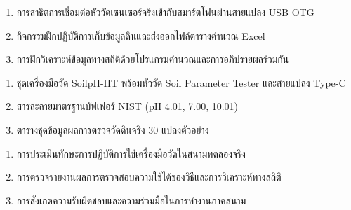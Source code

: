 \begin{tcolorbox}[
    enhanced, breakable,
    colback=white, colframe=rbruNavy,
    fonttitle=\bfseries\color{white},
    title={3. วิธีสอนและกิจกรรมการเรียนการสอน},
    arc=1.5mm, boxrule=0.8pt, leftrule=3.5mm
]
\begin{enumerate}
    \item การสาธิตการเชื่อมต่อหัววัดเซนเซอร์จริงเข้ากับสมาร์ตโฟนผ่านสายแปลง USB OTG
    \item กิจกรรมฝึกปฏิบัติการเก็บข้อมูลดินและส่งออกไฟล์ตารางคำนวณ Excel
    \item การฝึกวิเคราะห์ข้อมูลทางสถิติด้วยโปรแกรมคำนวณและการอภิปรายผลร่วมกัน
\end{enumerate}
\end{tcolorbox}

\begin{tcolorbox}[
    enhanced, breakable,
    colback=white, colframe=rbruNavy,
    fonttitle=\bfseries\color{white},
    title={4. สื่อการเรียนการสอน},
    arc=1.5mm, boxrule=0.8pt, leftrule=3.5mm
]
\begin{enumerate}
    \item ชุดเครื่องมือวัด SoilpH-HT พร้อมหัววัด Soil Parameter Tester และสายแปลง Type-C
    \item สารละลายมาตรฐานบัฟเฟอร์ NIST (pH 4.01, 7.00, 10.01)
    \item ตารางชุดข้อมูลผลการตรวจวัดดินจริง 30 แปลงตัวอย่าง
\end{enumerate}
\end{tcolorbox}

\begin{tcolorbox}[
    enhanced, breakable,
    colback=white, colframe=rbruNavy,
    fonttitle=\bfseries\color{white},
    title={5. การวัดและประเมินผล},
    arc=1.5mm, boxrule=0.8pt, leftrule=3.5mm
]
\begin{enumerate}
    \item การประเมินทักษะการปฏิบัติการใช้เครื่องมือวัดในสนามทดลองจริง
    \item การตรวจรายงานผลการตรวจสอบความใช้ได้ของวิธีและการวิเคราะห์ทางสถิติ
    \item การสังเกตความรับผิดชอบและความร่วมมือในการทำงานภาคสนาม
\end{enumerate}
\end{tcolorbox}

\clearpage

